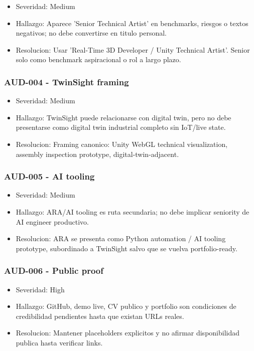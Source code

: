 \begin{itemize}
\item Severidad: Medium
\item Hallazgo: Aparece 'Senior Technical Artist' en benchmarks, riesgos o textos negativos; no debe convertirse en titulo personal.
\item Resolucion: Usar 'Real-Time 3D Developer / Unity Technical Artist'. Senior solo como benchmark aspiracional o rol a largo plazo.
\end{itemize}


\subsubsection{AUD-004 - TwinSight framing}


\begin{itemize}
\item Severidad: Medium
\item Hallazgo: TwinSight puede relacionarse con digital twin, pero no debe presentarse como digital twin industrial completo sin IoT/live state.
\item Resolucion: Framing canonico: Unity WebGL technical visualization, assembly inspection prototype, digital-twin-adjacent.
\end{itemize}


\subsubsection{AUD-005 - AI tooling}


\begin{itemize}
\item Severidad: Medium
\item Hallazgo: ARA/AI tooling es ruta secundaria; no debe implicar seniority de AI engineer productivo.
\item Resolucion: ARA se presenta como Python automation / AI tooling prototype, subordinado a TwinSight salvo que se vuelva portfolio-ready.
\end{itemize}


\subsubsection{AUD-006 - Public proof}


\begin{itemize}
\item Severidad: High
\item Hallazgo: GitHub, demo live, CV publico y portfolio son condiciones de credibilidad pendientes hasta que existan URLs reales.
\item Resolucion: Mantener placeholders explicitos y no afirmar disponibilidad publica hasta verificar links.
\end{itemize}


